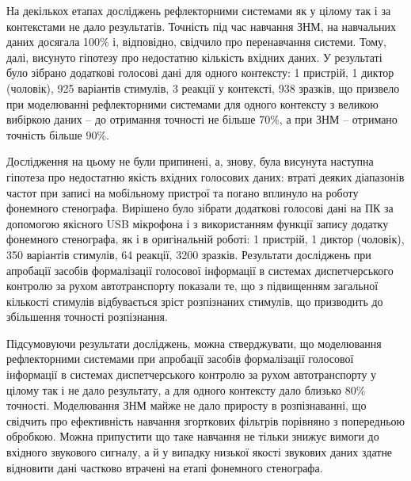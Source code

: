 На декількох етапах досліджень рефлекторними системами як у цілому так і за контекстами не дало результатів. Точність під час навчання ЗНМ, на навчальних даних досягала 100\% і, відповідно, свідчило про перенавчання системи. Тому, далі, висунуто гіпотезу про недостатню кількість вхідних даних. У результаті було зібрано додаткові голосові дані для одного контексту: 1 пристрій, 1 диктор (чоловік), 925 варіантів стимулів, 3 реакції у контексті, 938 зразків, що призвело при моделюванні рефлекторними системами для одного контексту з великою вибіркою даних – до отримання точності не більше 70\%, а при ЗНМ – отримано точність більше 90\%.

Дослідження на цьому не були припинені, а, знову, була висунута наступна гіпотеза про недостатню якість вхідних голосових даних: втраті деяких діапазонів частот при записі на мобільному пристрої та погано вплинуло на роботу фонемного стенографа. Вирішено було зібрати додаткові голосові дані на ПК за допомогою якісного USB мікрофона і з використанням функції запису додатку фонемного стенографа, як і в оригінальній роботі: 1 пристрій, 1 диктор (чоловік), 350 варіантів стимулів, 64 реакції, 3200 зразків. Результати досліджень при апробації засобів формалізації голосової інформації в системах диспетчерського контролю за рухом автотранспорту показали те, що з підвищенням загальної кількості стимулів відбувається зріст розпізнаних стимулів, що призводить до збільшення точності розпізнання.

Підсумовуючи результати досліджень, можна стверджувати, що моделювання рефлекторними системами при апробації засобів формалізації голосової інформації в системах диспетчерського контролю за рухом автотранспорту у цілому так і не дало результату, а для одного контексту дало близько 80\% точності. Моделювання ЗНМ майже не дало приросту в розпізнаванні, що свідчить про ефективність навчання згорткових фільтрів порівняно з попередньою обробкою. Можна припустити що таке навчання не тільки знижує вимоги до вхідного звукового сигналу, а й у випадку низької якості звукових даних здатне відновити дані частково втрачені на етапі фонемного стенографа.
